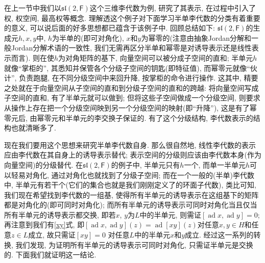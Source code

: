 \documentclass{ctexart}%
\theoremstyle{definition}
\theoremstyle{remark}
\DeclareMathOperator{\ad}{ad}
\begin{document}
在上一节中我们以$\mathfrak{sl}(2,\mathsf{F})$这个三维李代数为例, 研究了其表示, 在过程中引入了权, 权空间, 最高权等概念. 理解透这个例子对下面学习半单李代数的分类有着重要的意义, 可以说后面的好多思想都已蕴含于该例子中. 回顾总结如下: $\mathfrak{sl}(2,\mathsf{F})$的生成元$h,x,y$中, $h$为半单的(即可对角化), $x$和$y$为幂零的(注意由抽象Jordan分解和一般Jordan分解术语的一致性, 我们无需再区分半单和幂零是对诱导表示还是线性表示而言). 则在使$h$为对角矩阵的基下, 向量空间可以被分成子空间的直和; 半单元$h$就像``掌柜的'', 其悉知并保管各个分级子空间的钥匙(即特征值), 而幂零元就像``伙计'', 负责跑腿, 在不同分级空间中来回升降, 按掌柜的命令进行操作. 这其中, 精要之处就在于向量空间从子空间的直和到分级子空间的直和的跨越: 将向量空间写成子空间的直和, 有了半单元就可以做到; 但将这些子空间做成一个分级空间, 则要求从操作上存在把一个分级空间映到另一个分级空间的映射(即``升降''), 这是有了幂零元后, 由幂零元和半单元的李交换子保证的. 有了这个分级结构, 李代数表示的结构也就清晰多了.

现在我们要用这个思想来研究半单李代数自身. 那么很自然地, 线性李代数的表示应由李代数在其自身上的诱导表示替代; 表示空间的分级则应该由李代数本身(作为向量空间)的分级替代. 在$\mathfrak{sl}(2,\mathsf{F})$的例子中, 半单元只有$h$一个, 而单一半单元$h$可以轻易对角化, 通过对角化也就找到了分级子空间; 而在一个一般的(半单)李代数中, 半单元有若干个(它们的集合也就是我们刚刚定义了的环面子代数), 类比可知, 我们现在希望找到李代数的一组基, 使得所有半单元的诱导表示在这组基下的矩阵都是对角化的(即可同时对角化); 而所有半单元的诱导表示可同时对角化当且仅当所有半单元的诱导表示都交换, 即若$x$, $y$为$L$中的半单元, 则需证$[\ad x, \ad y]=0$; 再注意到我们有\eqref{xy}式, 即$[\ad x, \ad y](z)=\ad [xy](z)$对任意$x,y\in H$和任意$z\in L$成立, 故只需证$[xy]=0$ 对任意$L$中的半单元$x$和$y$成立. 经过这一系列的转换, 我们发现, 为证明所有半单元的诱导表示可同时对角化, 只需证半单元是交换的. 下面我们就证明这一结论.
\end{document}
